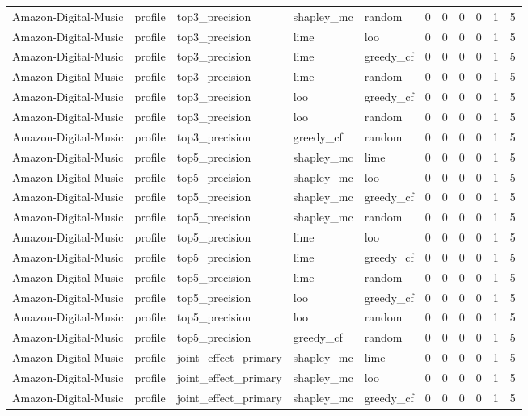 \begin{table}[t]
{\begin{tabular}{lllllrrrrrr}
Amazon-Digital-Music & profile & top3\_precision & shapley\_mc & random & 0 & 0 & 0 & 0 & 1 & 5 \\
Amazon-Digital-Music & profile & top3\_precision & lime & loo & 0 & 0 & 0 & 0 & 1 & 5 \\
Amazon-Digital-Music & profile & top3\_precision & lime & greedy\_cf & 0 & 0 & 0 & 0 & 1 & 5 \\
Amazon-Digital-Music & profile & top3\_precision & lime & random & 0 & 0 & 0 & 0 & 1 & 5 \\
Amazon-Digital-Music & profile & top3\_precision & loo & greedy\_cf & 0 & 0 & 0 & 0 & 1 & 5 \\
Amazon-Digital-Music & profile & top3\_precision & loo & random & 0 & 0 & 0 & 0 & 1 & 5 \\
Amazon-Digital-Music & profile & top3\_precision & greedy\_cf & random & 0 & 0 & 0 & 0 & 1 & 5 \\
Amazon-Digital-Music & profile & top5\_precision & shapley\_mc & lime & 0 & 0 & 0 & 0 & 1 & 5 \\
Amazon-Digital-Music & profile & top5\_precision & shapley\_mc & loo & 0 & 0 & 0 & 0 & 1 & 5 \\
Amazon-Digital-Music & profile & top5\_precision & shapley\_mc & greedy\_cf & 0 & 0 & 0 & 0 & 1 & 5 \\
Amazon-Digital-Music & profile & top5\_precision & shapley\_mc & random & 0 & 0 & 0 & 0 & 1 & 5 \\
Amazon-Digital-Music & profile & top5\_precision & lime & loo & 0 & 0 & 0 & 0 & 1 & 5 \\
Amazon-Digital-Music & profile & top5\_precision & lime & greedy\_cf & 0 & 0 & 0 & 0 & 1 & 5 \\
Amazon-Digital-Music & profile & top5\_precision & lime & random & 0 & 0 & 0 & 0 & 1 & 5 \\
Amazon-Digital-Music & profile & top5\_precision & loo & greedy\_cf & 0 & 0 & 0 & 0 & 1 & 5 \\
Amazon-Digital-Music & profile & top5\_precision & loo & random & 0 & 0 & 0 & 0 & 1 & 5 \\
Amazon-Digital-Music & profile & top5\_precision & greedy\_cf & random & 0 & 0 & 0 & 0 & 1 & 5 \\
Amazon-Digital-Music & profile & joint\_effect\_primary & shapley\_mc & lime & 0 & 0 & 0 & 0 & 1 & 5 \\
Amazon-Digital-Music & profile & joint\_effect\_primary & shapley\_mc & loo & 0 & 0 & 0 & 0 & 1 & 5 \\
Amazon-Digital-Music & profile & joint\_effect\_primary & shapley\_mc & greedy\_cf & 0 & 0 & 0 & 0 & 1 & 5 \\

\end{tabular}}
\end{table}
